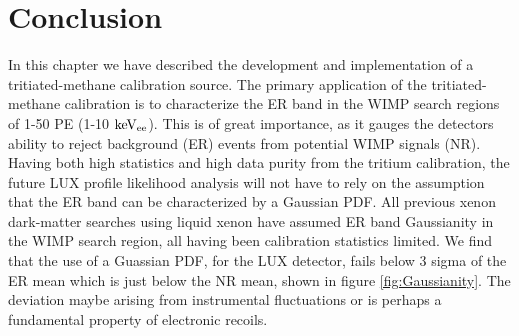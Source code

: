 \section{Conclusion}

In this chapter we have described the development and implementation of a tritiated-methane calibration source. The primary application of the tritiated-methane calibration is to characterize the ER band in the WIMP search regions of 1-50 PE (1-10 $\rm keV_{ee}$). This is of great importance, as it gauges the detectors ability to reject background (ER) events from potential WIMP signals (NR). Having both high statistics and high data purity from the tritium calibration, the future LUX profile likelihood analysis will not have to rely on the assumption that the ER band can be characterized by a Gaussian PDF.  All previous xenon dark-matter searches using liquid xenon have assumed ER band Gaussianity in the WIMP search region, all having been calibration statistics limited. We find that the use of a Guassian PDF, for the LUX detector, fails below 3 sigma of the ER mean which is just below the NR mean, shown in figure \ref{fig:Gaussianity}. The deviation maybe arising from instrumental fluctuations or is perhaps a fundamental property of electronic recoils. 

